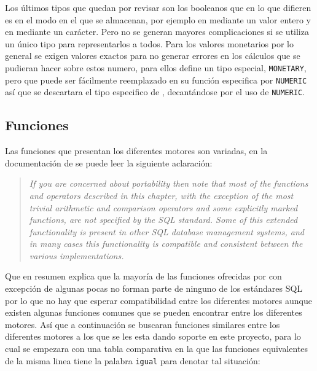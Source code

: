 Los últimos tipos que quedan por revisar son los booleanos que en lo que difieren es en el modo en el que se almacenan, por ejemplo en \m mediante un valor entero y en \p mediante un carácter. Pero no se generan mayores complicaciones si se utiliza un único tipo para representarlos a todos. Para los valores monetarios por lo general se exigen valores exactos para no generar errores en los cálculos que se pudieran hacer sobre estos numero, para ellos \p define un tipo especial, \verb=MONETARY=, pero que puede ser fácilmente reemplazado en su función especifica por \verb=NUMERIC= así que se descartara el tipo especifico de \p, decantándose por el uso de \verb=NUMERIC=.  
\subsection{Funciones}
\label{especificacion:funciones} 
Las funciones que presentan los diferentes motores son variadas, en la documentación de  \p se puede leer\citep{postgre:functions} la siguiente aclaración:
%
\begin{quotation}
\textit{If you are concerned about portability then note that most of the functions and operators described in this chapter, with the exception of the most trivial arithmetic and comparison operators and some explicitly marked functions, are not specified by the SQL standard. Some of this extended functionality is present in other SQL database management systems, and in many cases this functionality is compatible and consistent between the various implementations.}
\end{quotation}
%
Que en resumen explica que la mayoría de las funciones ofrecidas por \p con excepción de algunas pocas no forman parte de ninguno de los estándares SQL por lo que no hay que esperar compatibilidad entre los diferentes motores aunque existen algunas funciones comunes que se pueden encontrar entre los diferentes motores. Así que a continuación se buscaran funciones similares entre los diferentes motores a los que se les esta dando soporte en este proyecto, para lo cual se empezara con una tabla comparativa en la que las funciones equivalentes de la misma linea tiene la palabra \verb=igual= para denotar tal situación:

